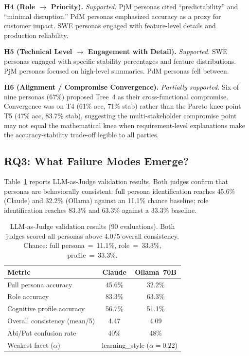 \documentclass[sigconf,review]{acmart}
\begin{document}
\textbf{H4 (Role $\rightarrow$ Priority).} \textit{Supported.}
PjM personas cited ``predictability'' and ``minimal disruption.''
PdM personas emphasized accuracy as a proxy for customer impact.
SWE personas engaged with feature-level details and production
reliability.

\textbf{H5 (Technical Level $\rightarrow$ Engagement with Detail).}
\textit{Supported.} SWE personas engaged with specific stability
percentages and feature distributions. PjM personas focused on
high-level summaries. PdM personas fell between.

\textbf{H6 (Alignment / Compromise Convergence).}
\textit{Partially supported.} Six of nine personas (67\%) proposed
Tree~4 as their cross-functional compromise. Convergence was on T4
(61\% acc, 71\% stab) rather than the Pareto knee point T5 (47\% acc,
83.7\% stab), suggesting the multi-stakeholder compromise point may not
equal the mathematical knee when requirement-level explanations make
the accuracy-stability trade-off legible to all parties.

\subsection{RQ3: What Failure Modes Emerge?}
\label{sec:rq3}

Table~\ref{tab:rq3} reports LLM-as-Judge validation results. Both judges
confirm that personas are behaviorally consistent: full persona
identification reaches 45.6\% (Claude) and 32.2\% (Ollama) against an
11.1\% chance baseline; role identification reaches 83.3\% and 63.3\%
against a 33.3\% baseline.

\begin{table}[ht]
  \caption{LLM-as-Judge validation results (90 evaluations). Both judges
           scored all personas above 4.0/5 overall consistency.
           Chance: full persona~=~11.1\%, role~=~33.3\%,
           profile~=~33.3\%.}
  \label{tab:rq3}
  \small
  \begin{tabular}{lcc}
    \toprule
    \textbf{Metric} & \textbf{Claude} & \textbf{Ollama~70B} \\
    \midrule
    Full persona accuracy        & 45.6\% & 32.2\% \\
    Role accuracy                & 83.3\% & 63.3\% \\
    Cognitive profile accuracy   & 56.7\% & 51.1\% \\
    Overall consistency (mean/5) & 4.47   & 4.09   \\
    Abi/Pat confusion rate       & 40\%   & 48\%   \\
    Weakest facet ($\alpha$) & \multicolumn{2}{c}{learning\_style ($\alpha=0.22$)} \\
    \bottomrule
  \end{tabular}
\end{table}
\end{document}
